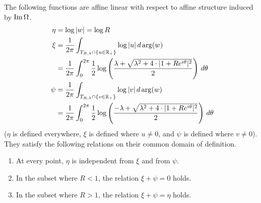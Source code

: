 \documentclass[12pt]{amsart}
\begin{document}
\begin{proposition}
  \label{prop:affine-coords}
  The following functions are affine linear with respect to affine structure induced by $\operatorname{Im} \Omega$.
  \begin{equation}
    \label{eq:affine-coords-uw}
    \begin{split}
      \eta &= \log|w| = \log R\\
      \xi &= \frac{1}{2\pi}\int_{T_{R,\lambda}\cap \{u \in \mathbb{R}_+\}}
      \log|u|\,
      d\arg(w)\\
      &= \frac{1}{2\pi}\int_0^{2\pi}
      \frac{1}{2}\log\left(\frac{\lambda +\sqrt{\lambda^2 + 4\cdot
            |1+Re^{i\theta}|^2}}{2}\right)\,d\theta\\
\psi&= \frac{1}{2\pi}\int_{T_{R,\lambda}\cap \{v\in \mathbb{R}_+\}} \log|v|\, d\arg(w)\\
      &= \frac{1}{2\pi}\int_0^{2\pi}
      \frac{1}{2}\log\left(\frac{-\lambda +\sqrt{\lambda^2 +
            4\cdot |1+Re^{i\theta}|^2}}{2}\right)\, d\theta
    \end{split}
  \end{equation}
  ($\eta$ is defined everywhere, $\xi$ is defined where $u \neq 0$, and $\psi$ is defined where $v \neq 0$).
  They satisfy the following relations on their common domain of definition.
  \begin{enumerate}
  \item At every point, $\eta$ is independent from $\xi$ and from $\psi$.
  \item In the subset where $R < 1$, the relation $\xi + \psi = 0$ holds.
  \item In the subset where $R > 1$, the relation $\xi + \psi = \eta$
    holds.
  \end{enumerate}
\end{proposition}
\end{document}
